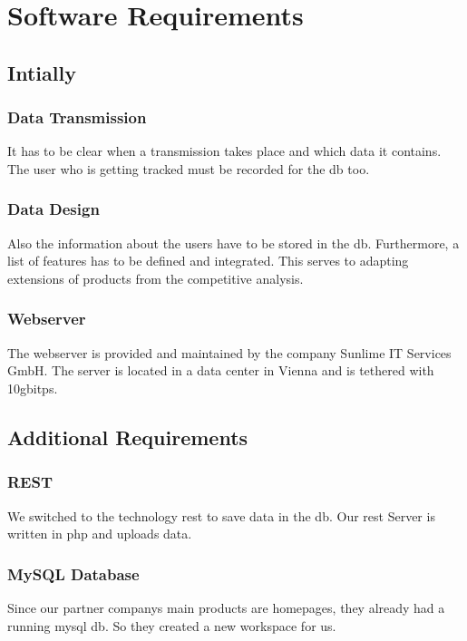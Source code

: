 \chapter{Software Requirements}
\section{Intially}
\subsection{Data Transmission}
It has to be clear when a transmission takes place and which data it contains. The user who is getting tracked must be recorded for the \gls{db} too.
\subsection{Data Design}
Also the information about the users have to be stored in the \gls{db}. Furthermore, a list of features has to be defined and integrated. This serves to adapting extensions of products from the competitive analysis.
\subsection{Webserver}
The webserver is provided and maintained by the company Sunlime IT Services GmbH. The server is located in a data center in Vienna and is tethered with 10\gls{gbitps}.
\section{Additional Requirements}
\subsection{REST}
We switched to the technology \gls{rest} to save data in the \gls{db}. Our \gls{rest} Server is written in \gls{php} and uploads data.
\subsection{MySQL Database}
Since our partner companys main products are homepages, they already had a running \gls{mysql} \gls{db}. So they created a new workspace for us.
\clearpageauthor

